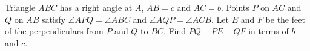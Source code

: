 Triangle $ABC$ has a right angle at $A$, $AB=c$ and $AC=b$. Points $P$ on $AC$ and $Q$ on $AB$ satisfy $\angle APQ=\angle ABC$ and $\angle AQP=\angle ACB$. Let $E$ and $F$ be the feet of the perpendiculars from $P$ and $Q$ to $BC$. Find $PQ+PE+QF$ in terms of $b$ and $c$.
